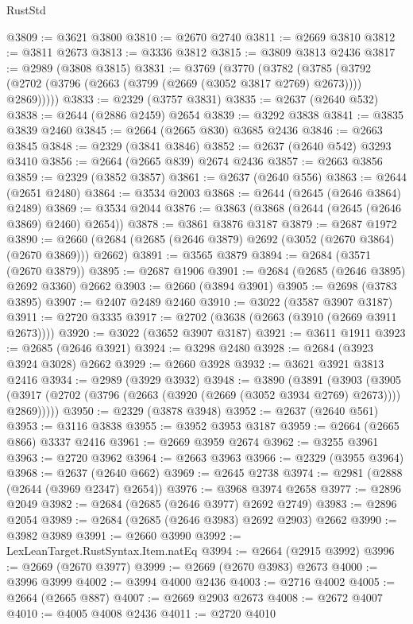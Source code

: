 \begin{lexlean}{RustStd}
\begin{coremodule}
@3809 := @3621 @3800
@3810 := @2670 @2740
@3811 := @2669 @3810
@3812 := @3811 @2673
@3813 := @3336 @3812
@3815 := @3809 @3813 @2436
@3817 := @2989 (@3808 @3815)
@3831 := @3769
    (@3770
      (@3782
        (@3785 (@3792 (@2702 (@3796 (@2663 (@3799 (@2669 (@3052 @3817 @2769) @2673)))) @2869)))))
@3833 := @2329 (@3757 @3831)
@3835 := @2637 (@2640 @532)
@3838 := @2644 (@2886 @2459) @2654
@3839 := @3292 @3838
@3841 := @3835 @3839 @2460
@3845 := @2664 (@2665 @830) @3685 @2436
@3846 := @2663 @3845
@3848 := @2329 (@3841 @3846)
@3852 := @2637 (@2640 @542) @3293 @3410
@3856 := @2664 (@2665 @839) @2674 @2436
@3857 := @2663 @3856
@3859 := @2329 (@3852 @3857)
@3861 := @2637 (@2640 @556)
@3863 := @2644 (@2651 @2480)
@3864 := @3534 @2003
@3868 := @2644 (@2645 (@2646 @3864) @2489)
@3869 := @3534 @2044
@3876 := @3863 (@3868 (@2644 (@2645 (@2646 @3869) @2460) @2654))
@3878 := @3861 @3876 @3187
@3879 := @2687 @1972
@3890 := @2660 (@2684 (@2685 (@2646 @3879) @2692 (@3052 (@2670 @3864) (@2670 @3869))) @2662)
@3891 := @3565 @3879
@3894 := @2684 (@3571 (@2670 @3879))
@3895 := @2687 @1906
@3901 := @2684 (@2685 (@2646 @3895) @2692 @3360) @2662
@3903 := @2660 (@3894 @3901)
@3905 := @2698 (@3783 @3895)
@3907 := @2407 @2489 @2460
@3910 := @3022 (@3587 @3907 @3187)
@3911 := @2720 @3335
@3917 := @2702 (@3638 (@2663 (@3910 (@2669 @3911 @2673))))
@3920 := @3022 (@3652 @3907 @3187)
@3921 := @3611 @1911
@3923 := @2685 (@2646 @3921)
@3924 := @3298 @2480
@3928 := @2684 (@3923 @3924 @3028) @2662
@3929 := @2660 @3928
@3932 := @3621 @3921 @3813 @2416
@3934 := @2989 (@3929 @3932)
@3948 := @3890
    (@3891
      (@3903
        (@3905 (@3917 (@2702 (@3796 (@2663 (@3920 (@2669 (@3052 @3934 @2769) @2673)))) @2869)))))
@3950 := @2329 (@3878 @3948)
@3952 := @2637 (@2640 @561)
@3953 := @3116 @3838
@3955 := @3952 @3953 @3187
@3959 := @2664 (@2665 @866) @3337 @2416
@3961 := @2669 @3959 @2674
@3962 := @3255 @3961
@3963 := @2720 @3962
@3964 := @2663 @3963
@3966 := @2329 (@3955 @3964)
@3968 := @2637 (@2640 @662)
@3969 := @2645 @2738
@3974 := @2981 (@2888 (@2644 (@3969 @2347) @2654))
@3976 := @3968 @3974 @2658
@3977 := @2896 @2049
@3982 := @2684 (@2685 (@2646 @3977) @2692 @2749)
@3983 := @2896 @2054
@3989 := @2684 (@2685 (@2646 @3983) @2692 @2903) @2662
@3990 := @3982 @3989
@3991 := @2660 @3990
@3992 := LexLeanTarget.RustSyntax.Item.natEq
@3994 := @2664 (@2915 @3992)
@3996 := @2669 (@2670 @3977)
@3999 := @2669 (@2670 @3983) @2673
@4000 := @3996 @3999
@4002 := @3994 @4000 @2436
@4003 := @2716 @4002
@4005 := @2664 (@2665 @887)
@4007 := @2669 @2903 @2673
@4008 := @2672 @4007
@4010 := @4005 @4008 @2436
@4011 := @2720 @4010

\end{coremodule}
\end{lexlean}
